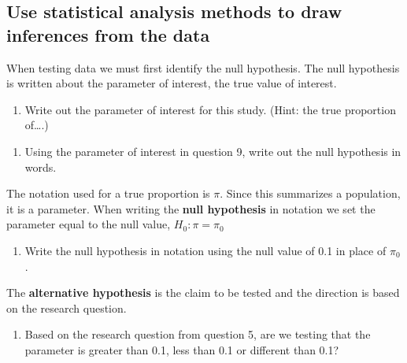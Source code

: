 \documentclass[
]{report}
\providecommand{\tightlist}{%
  \setlength{\itemsep}{0pt}\setlength{\parskip}{0pt}}
\begin{document}
\vspace{0.5in}

\hypertarget{use-statistical-analysis-methods-to-draw-inferences-from-the-data}{%
\subsection{Use statistical analysis methods to draw inferences from the data}\label{use-statistical-analysis-methods-to-draw-inferences-from-the-data}}

When testing data we must first identify the null hypothesis. The null hypothesis is written about the parameter of interest, the true value of interest.

\begin{enumerate}
\def\labelenumi{\arabic{enumi}.}
\setcounter{enumi}{8}
\tightlist
\item
  Write out the parameter of interest for this study. (Hint: the true proportion of\ldots.)
\end{enumerate}

\vspace{1in}

\begin{enumerate}
\def\labelenumi{\arabic{enumi}.}
\setcounter{enumi}{9}
\tightlist
\item
  Using the parameter of interest in question 9, write out the null hypothesis in words.
\end{enumerate}

\vspace{1in}

\newpage

The notation used for a true proportion is \(\pi\). Since this summarizes a population, it is a parameter. When writing the \textbf{null hypothesis} in notation we set the parameter equal to the null value, \(H_0: \pi = \pi_0\)

\begin{enumerate}
\def\labelenumi{\arabic{enumi}.}
\setcounter{enumi}{10}
\tightlist
\item
  Write the null hypothesis in notation using the null value of 0.1 in place of \(\pi_0\).
\end{enumerate}

\vspace{0.5in}

The \textbf{alternative hypothesis} is the claim to be tested and the direction is based on the research question.

\begin{enumerate}
\def\labelenumi{\arabic{enumi}.}
\setcounter{enumi}{11}
\tightlist
\item
  Based on the research question from question 5, are we testing that the parameter is greater than 0.1, less than 0.1 or different than 0.1?
\end{enumerate}
\end{document}
